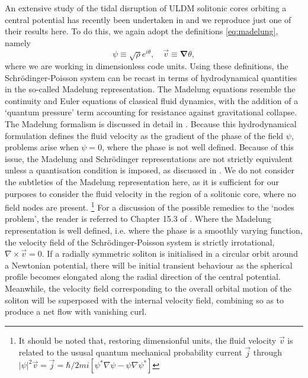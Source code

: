 \documentclass[a4paper,11pt]{article}
\begin{document}
An extensive study of the tidal disruption of ULDM solitonic cores orbiting a central potential has recently been undertaken in \cite{Du2018} and we reproduce just one of their results here. To do this, we again adopt the definitions \ref{eq:madelung}, namely
\begin{equation}\label{eq:madelung_repeated}
    \psi\equiv\sqrt{\rho}e^{i\theta}, \quad \vec{v}\equiv\boldsymbol{\nabla}\theta,
\end{equation}
where we are working in dimensionless code units. Using these definitions, the Schr{\"o}dinger-Poisson system can be recast in terms of hydrodynamical quantities in the so-called Madelung representation. The Madelung equations resemble the continuity and Euler equations of classical fluid dynamics, with the addition of a `quantum pressure' term accounting for resistance against gravitational collapse. The Madelung formalism is discussed in detail in \cite{Suarez2011, Suarez2015, Johnston2010, Kopp2017}. Because this hydrodynamical formulation defines the fluid velocity as the gradient of the phase of the field $\psi$, problems arise when $\psi=0$, where the phase is not well defined. Because of this issue, the Madelung and Schr{\"o}dinger representations are not strictly equivalent unless a quantisation condition is imposed, as discussed in \cite{Wallstrom1994}. We do not consider the subtleties of the Madelung representation here, as it is sufficient for our purposes to consider the fluid velocity in the region of a solitonic core, where no field nodes are present. \footnote{It should be noted that, restoring dimensionful units, the fluid velocity $\vec{v}$ is related to the ususal quantum mechanical probability current $\vec{j}$ through $\vert\psi\vert^2\vec{v} = \vec{j} = \hbar/2mi\left[\psi^*\nabla\psi-\psi\nabla\psi^*\right]$} For a discussion of the possible remedies to the `nodes problem', the reader is referred to Chapter 15.3 of \cite{Wyatt2005}.
Where the Madelung representation is well defined, i.e. where the phase is a smoothly varying function, the velocity field of the Schr{\"o}dinger-Poisson system is strictly irrotational, $\nabla\times\vec{v}=0$. If a radially symmetric soliton is initialised in a circular orbit around a Newtonian potential, there will be initial transient behaviour as the spherical profile becomes elongated along the radial direction of the central potential. Meanwhile, the velocity field corresponding to the overall orbital motion of the soliton will be superposed with the internal velocity field, combining so as to produce a net flow with vanishing curl. 
\end{document}
